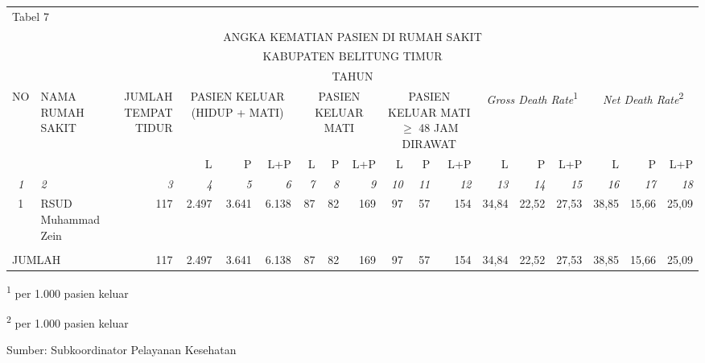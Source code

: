 {}

\begin{tabular}{clrrrrrrrrrrrrrrrr}
	\multicolumn{18}{l}{Tabel 7}\\
	\multicolumn{18}{c}{ANGKA KEMATIAN PASIEN DI RUMAH SAKIT}\\
	\multicolumn{18}{c}{KABUPATEN BELITUNG TIMUR}\\
	\multicolumn{18}{c}{TAHUN \tP}\\
	\toprule
	\multirow{2}{*}{NO} & \multirow{2}{*}{NAMA RUMAH SAKIT} & \multirow{2}{1.5cm}{\raggedleft JUMLAH TEMPAT TIDUR} & \multicolumn{3}{c}{\parbox{3cm}{\centering PASIEN KELUAR (HIDUP + MATI)}} & \multicolumn{3}{c}{\parbox{3cm}{\centering PASIEN KELUAR MATI}} &\multicolumn{3}{c}{\parbox{2.9cm}{\centering PASIEN KELUAR MATI $\geq$ 48 JAM DIRAWAT}} & \multicolumn{3}{c}{\parbox{2.9cm}{\centering \emph{Gross Death Rate}\textsuperscript{1}}} & \multicolumn{3}{c}{\parbox{2.9cm}{\centering \emph{Net Death Rate}\textsuperscript{2}}} \\
	\cmidrule(l{2pt}r{2pt}){4-6}\cmidrule(l{2pt}r{2pt}){7-9}\cmidrule(l{2pt}r{2pt}){10-12}\cmidrule(l{2pt}r{2pt}){13-15}\cmidrule(l{2pt}r{2pt}){16-18}
	& & & L & P & L+P & L & P & L+P & L & P & L+P & L & P & L+P & L & P & L+P \\
	\midrule
	\emph{1} & \emph{2} & \emph{3} & \emph{4} & \emph{5} & \emph{6} & \emph{7} & \emph{8} & \emph{9} & \emph{10} & \emph{11} & \emph{12} & \emph{13} & \emph{14} & \emph{15} & \emph{16} & \emph{17} & \emph{18} \\
	\midrule
	1 & RSUD Muhammad Zein     & 117 & 2.497 & 3.641 & 6.138 & 87 & 82 & 169 & 97 & 57 & 154 & 34,84 & 22,52 & 27,53 & 38,85 & 15,66 & 25,09 \\
	&&&&&&&&&&&&&&&&&\\
	\midrule
	\multicolumn{2}{l}{JUMLAH} & 117 & 2.497 & 3.641 & 6.138 & 87 & 82 & 169 & 97 & 57 & 154 & 34,84 & 22,52 & 27,53 & 38,85 & 15,66 & 25,09 \\
	\bottomrule
\end{tabular}%
\vspace{2ex}

{
\textsuperscript{1} per 1.000 pasien keluar\par
\textsuperscript{2} per 1.000 pasien keluar}

\vfill
Sumber: Subkoordinator Pelayanan Kesehatan\par
